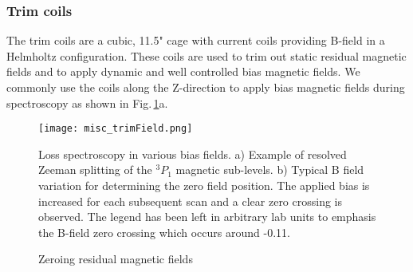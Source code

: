 
\subsubsection{Trim coils}
The trim coils are a cubic, 11.5" cage with current coils providing B-field in a Helmholtz configuration.
These coils are used to trim out static residual magnetic fields and to apply dynamic and well controlled bias magnetic fields.
We commonly use the coils along the Z-direction to apply bias magnetic fields during spectroscopy as shown in Fig.\,\ref{fig:trimField}a.
	\begin{figure}
		\centerline{
		\texttt{[image: misc\_trimField.png]}}
		\caption{Zeroing residual magnetic fields}{Loss spectroscopy in various bias fields. a) Example of resolved Zeeman splitting of the $^3P_1$ magnetic sub-levels. b) Typical B field variation for determining the zero field position. The applied bias is increased for each subsequent scan and a clear zero crossing is observed. The legend has been left in arbitrary lab units to emphasis the B-field zero crossing which occurs around -0.11.}
		\label{fig:trimField}
	\end{figure} 
	
